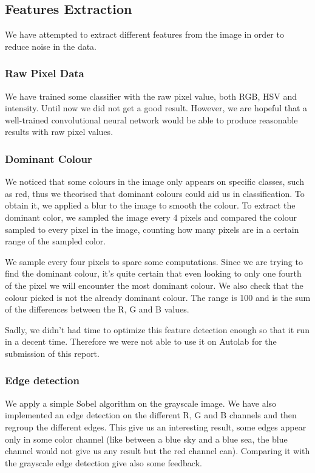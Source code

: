 \documentclass{article} %
\begin{document}
\subsection{Features Extraction}
We have attempted to extract different features from the image in order to reduce noise in the data.

\subsubsection{Raw Pixel Data}
We have trained some classifier with the raw pixel value, both RGB, HSV and intensity. Until now we did not get a good result. However, we are hopeful that a well-trained convolutional neural network would be able to produce reasonable results with raw pixel values.

\subsubsection{Dominant Colour}
We noticed that some colours in the image only appears on specific classes, such as red, thus we theorised that dominant colours could aid us in classification. To obtain it, we applied a blur to the image to smooth the colour. To extract the dominant color, we sampled the image every 4 pixels and compared the colour sampled to every pixel in the image, counting how many pixels are in a certain range of the sampled color.

We sample every four pixels to spare some computations. Since we are trying to find the dominant colour, it's quite certain that even looking to only one fourth of the pixel we will encounter the most dominant colour. We also check that the colour picked is not the already dominant colour. The range is 100 and is the sum of the differences between the R, G and B values. 

Sadly, we didn't had time to optimize this feature detection enough so that it run in a decent time. Therefore we were not able to use it on Autolab for the submission of this report.

\subsubsection{Edge detection}
We apply a simple Sobel algorithm on the grayscale image. We have also implemented an edge detection on the different R, G and B channels and then regroup the different edges. This give us an interesting result, some edges appear only in some color channel (like between a blue sky and a blue sea, the blue channel would not give us any result but the red channel can). Comparing it with the grayscale edge detection give also some feedback.
\end{document}
